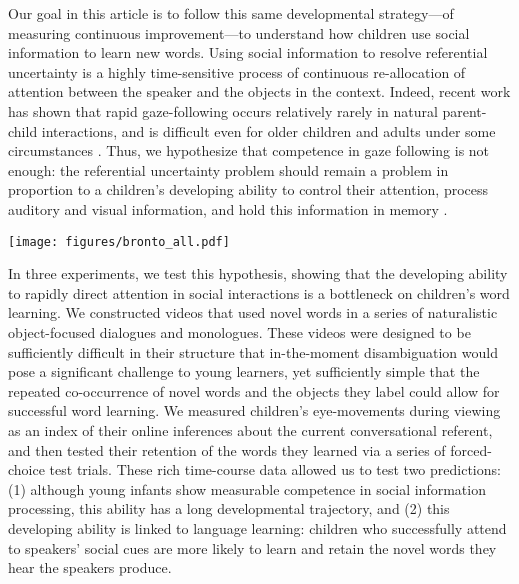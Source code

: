\documentclass{pnastwo}
\begin{document}
\begin{article}
Our goal in this article is to follow this same developmental strategy---of measuring continuous improvement---to understand how children use social information to learn new words. Using social information to resolve referential uncertainty is a highly time-sensitive process of continuous re-allocation of attention between the speaker and the objects in the context. Indeed, recent work has shown that rapid gaze-following occurs relatively rarely in natural parent-child interactions, and is difficult even for older children and adults under some circumstances \citep{loomis2008, vida2012, yu2013}. Thus, we hypothesize that competence in gaze following is not enough: the referential uncertainty problem should remain a problem in proportion to a children's developing ability to control their attention, process auditory and visual information, and hold this information in memory \citep{dempster1981, kail1991, gathercole2004}.

\begin{figure*}
        \texttt{[image: figures/bronto\_all.pdf]}
	\caption{\label{fig:reflook_learning} (top) Looking to Target vs. Competitor objects during the learning portion of Experiments 1 (typically-developing children and adults) and 2 (children with ASD), plotted by phase of the naming event. Points show means and error bars show 95\% confidence interval across participants; points are offset on the horizontal to avoid overplotting. Colors indicate age in years for typically developing children. (bottom) Example frames from the first word learning dialogue in Experiment 1. Each image shows the regions of interest used for later analysis (white boxes) and a heat map of the distribution of all participants' points of gaze over time (brighter colors indicate more fixation; scale is constant across frames). See Supporting Information for a video representation.}
\end{figure*}

In three experiments, we test this hypothesis, showing that the developing ability to rapidly direct attention in social interactions is a bottleneck on children's word learning. We constructed videos that used novel words in a series of naturalistic object-focused dialogues and monologues. These videos were designed to be sufficiently difficult in their structure that in-the-moment disambiguation would pose a significant challenge to young learners, yet sufficiently simple that the repeated co-occurrence of novel words and the objects they label could allow for successful word learning. We measured children's eye-movements during viewing as an index of their online inferences about the current conversational referent, and then tested their retention of the words they learned via a series of forced-choice test trials. These rich time-course data allowed us to test two predictions: (1) although young infants show measurable competence in social information processing, this ability has a long developmental trajectory, and (2) this developing ability is linked to language learning: children who successfully attend to speakers' social cues are more likely to learn and retain the novel words they hear the speakers produce.


\end{article}
\end{document}
